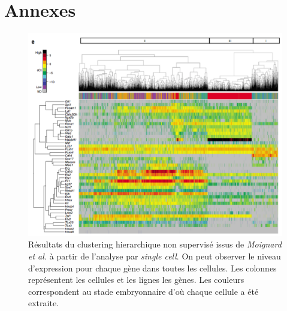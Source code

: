 \documentclass[fleqn,11pt]{SelfArx} %
\providecommand\phantomsection{}
\begin{document}
\newpage
\phantomsection



\newpage
\section*{Annexes}

\begin{figure}[ht]
\centering
\includegraphics[width=\linewidth]{images/article2}
\caption{Résultats du clustering hierarchique non supervisé issus de \textit{Moignard et al.} à partir de l'analyse par \textit{single cell}. On peut observer le niveau d'expression pour chaque gène dans toutes les cellules. Les colonnes représentent les cellules et les lignes les gènes. Les couleurs correspondent au stade embryonnaire d'où chaque cellule a été extraite.}
\label{fig:article2}
\end{figure}

\end{document}
